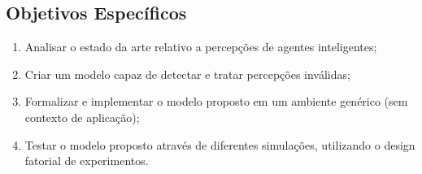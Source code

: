 \subsection{Objetivos Específicos}

\begin{enumerate}
    \item Analisar o estado da arte relativo a percepções de agentes inteligentes;
    \item Criar um modelo capaz de detectar e tratar percepções inválidas;
    \item Formalizar e implementar o modelo proposto em um ambiente genérico (sem contexto de aplicação);
        \item Testar o modelo proposto através de diferentes simulações, utilizando o design fatorial de experimentos. 
\end{enumerate}